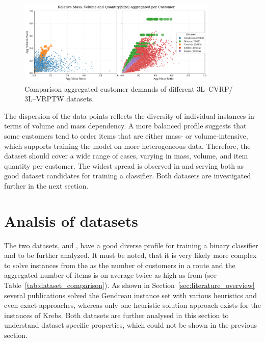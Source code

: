 \begin{figure}[ht]
  \centering
  \includegraphics[width=0.85\textwidth]{pictures/comparison_datasets_3lcvrp.png}
  \caption{Comparison aggregated customer demands of different 3L--CVRP/ 3L--VRPTW datasets.}
  \label{fig:dataset_comparison}
\end{figure}

The dispersion of the data points reflects the diversity of individual instances in terms of volume
and mass dependency. A more balanced profile suggests that some customers tend to order items that
are either mass- or volume-intensive, which supports training the model on more heterogeneous data.
Therefore, the dataset should cover a wide range of cases, varying in mass, volume, and item
quantity per customer. The widest spread is observed in \krebsADataSetText and \gendreauDataSetText serving
both as good dataset candidates for training a classifier. Both datasets are investigated further in
the next section.

\section{Analsis of datasets}
\label{sec:analysis_datasets}

The two datasets, \krebsADataSetText and \gendreauDataSetText, have a good diverse profile for training
a binary classifier and to be further analyzed. It must be noted, that it is very likely more complex
to solve instances from the \krebsADataSetText as the number of customers in a route and the
aggregated number of items is on average twice as high as from \gendreauDataSetText (see Table~\ref{tab:dataset_comparison}).
As shown in Section~\ref{sec:literature_overview} several publications solved the Gendreau instance set
with various heuristics and even exact approaches, whereas only one heuristic solution approach exists for the instances of Krebs.
Both datasets are further analysed in this section to understand dataset specific properties, which could not
be shown in the previous section.

